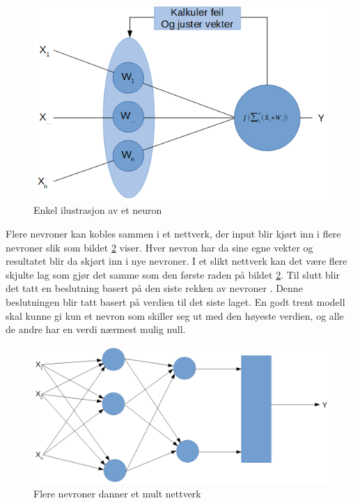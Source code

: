 \begin{figure}[ht]
    \centering
    \includegraphics[width=\textwidth]{images/neuron.png}
    \caption{Enkel ilustrasjon av et neuron}
    \label{fig:neuron}
\end{figure}
\newpage
Flere nevroner kan kobles sammen i et nettverk, der input blir kjørt inn i flere nevroner slik som bildet \ref{fig:nettverk} viser. Hver nevron har da sine egne vekter og resultatet blir da skjørt inn i nye nevroner. I et slikt nettverk kan det være flere skjulte lag som gjør det samme som den første raden på bildet \ref{fig:nettverk}. Til slutt blir det tatt en beslutning basert på den siste rekken av nevroner \cite{Bonaccorso2017}. Denne beslutningen blir tatt basert på verdien til det siste laget. En godt trent modell skal kunne gi kun et nevron som skiller seg ut med den høyeste verdien, og alle de andre har en verdi nærmest mulig null.

\begin{figure}[ht]
    \centering
    \includegraphics[width=\textwidth]{images/neuron_multi.png}
    \caption{Flere nevroner danner et mult nettverk}
    \label{fig:nettverk}
\end{figure}

